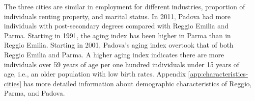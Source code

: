 The three cities are similar in employment for different industries, proportion of individuals renting property, and marital status. In 2011, Padova had more individuals with post-secondary degrees compared with Reggio Emilia and Parma. Starting in 1991, the aging index has been higher in Parma than in Reggio Emilia. Starting in 2001, Padova's aging index overtook that of both Reggio Emilia and Parma. A higher aging index indicates there are more individuals over 59 years of age per one hundred individuals under 15 years of age, i.e., an older population with low birth rates. Appendix \ref{app:characteristics-cities} has more detailed information about demographic characteristics of Reggio, Parma, and Padova. 

%	

%	




